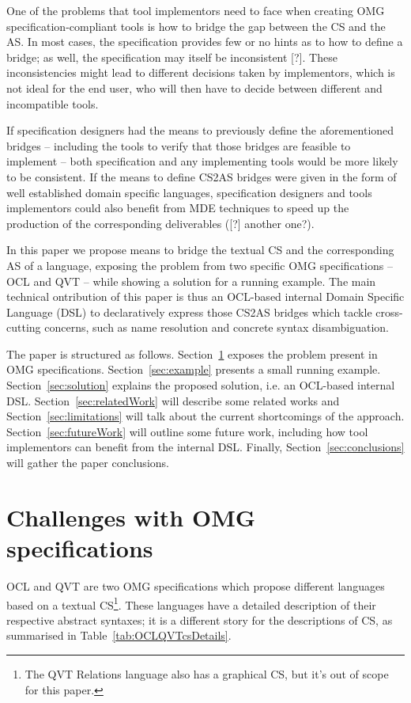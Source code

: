\documentclass{llncs}
\begin{document}
One of the problems that tool implementors need to face when creating OMG specification-compliant tools is how to bridge the gap between the CS and the AS. In most cases, the specification provides few or no hints as to how to define a bridge; as well, the specification may itself be inconsistent [?]. These inconsistencies might lead to different decisions taken by implementors, which is not ideal for the end user, who will then have to decide between different and incompatible tools.

If specification designers had the means to previously define the aforementioned bridges -- including the tools to verify that those bridges are feasible to implement -- both specification and any implementing tools would be more likely to be consistent. If the means to define CS2AS bridges were given in the form of well established domain specific languages, specification designers and tools implementors could also benefit from MDE techniques to speed up the production of the corresponding deliverables \cite{kosar2010dslVsgpl} ([?] another one?).

In this paper we propose means to bridge the textual CS and the corresponding AS of a language, exposing the problem from two specific OMG specifications -- OCL and QVT -- while showing a solution for a running example. The main technical ontribution of this paper is thus an OCL-based internal Domain Specific Language (DSL) \cite{fowler2010dsl} to declaratively express those CS2AS bridges which tackle cross-cutting concerns, such as name resolution and concrete syntax disambiguation.

The paper is structured as follows. Section~\ref{sec:problem} exposes the problem present in OMG specifications. Section~\ref{sec:example} presents a small running example. Section~\ref{sec:solution} explains the proposed solution, i.e. an OCL-based internal DSL. Section~\ref{sec:relatedWork} will describe some related works and Section~\ref{sec:limitations} will talk about the current shortcomings of the approach. Section~\ref{sec:futureWork} will outline some future work, including how tool implementors can benefit from the internal DSL. Finally, Section~\ref{sec:conclusions} will gather the paper conclusions.

\section{Challenges with OMG specifications}
\label{sec:problem}

OCL \cite{omg2013ocl} and QVT \cite{omg2014qvt} are two OMG specifications which propose different languages based on a textual CS\footnote{The QVT Relations language also has a graphical CS, but it's out of scope for this paper.}. These languages have a detailed description of their respective abstract syntaxes; it is a different story for the descriptions of CS, as summarised in Table~\ref{tab:OCLQVTcsDetails}.
\end{document}

